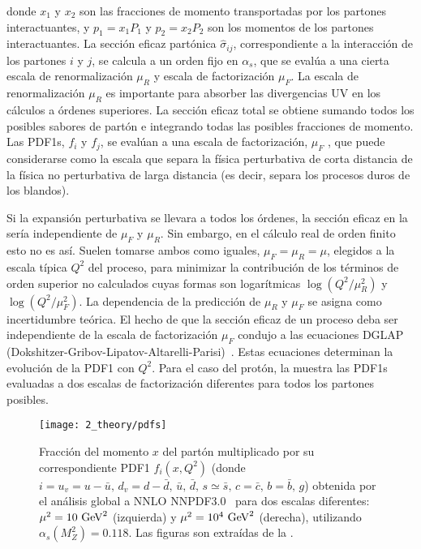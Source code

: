 donde \(x_1\) y \(x_2\) son las fracciones de momento transportadas por los partones interactuantes, y \(p_1 = x_1 P_1\) y \(p_2 = x_2 P_2\) son los momentos de los partones interactuantes. La sección eficaz partónica \(\hat{\sigma}_{ij}\), correspondiente a la interacción de los partones \(i\) y \(j\), se calcula a un orden fijo en \(\alpha_s\), que se evalúa a una cierta escala de renormalización \(\mu_R\) y escala de factorización \(\mu_F\). La escala de renormalización \(\mu_R\) es importante para absorber las divergencias \ac{UV} en los cálculos a órdenes superiores. La sección eficaz total se obtiene sumando todos los posibles sabores de partón e integrando todas las posibles fracciones de momento. Las \acp{PDF1}, \(f_i\) y \(f_j\), se evalúan a una escala de factorización, \(\mu_F\) , que puede considerarse como la escala que separa la física perturbativa de corta distancia de la física no perturbativa de larga distancia (es decir, separa los procesos duros de los blandos).

Si la expansión perturbativa se llevara a todos los órdenes, la sección eficaz en la \Eqn{\ref{eq:theory:sm:hadron_interactions:xs}} sería independiente de \(\mu_F\) y \(\mu_R\). Sin embargo, en el cálculo real de orden finito esto no es así. Suelen tomarse ambos como iguales, \(\mu_F = \mu_R = \mu\), elegidos a la escala típica \(Q^2\) del proceso, para minimizar la contribución de los términos de orden superior no calculados cuyas formas son logarítmicas \(\log\left(Q^2/\mu_R^2\right)\) y \(\log\left(Q^2/\mu_F^2\right)\). La dependencia de la predicción de \(\mu_R\) y \(\mu_F\) se asigna como incertidumbre teórica. El hecho de que la sección eficaz de un proceso deba ser independiente de la escala de factorización \(\mu_F\) condujo a las ecuaciones DGLAP (Dokshitzer-Gribov-Lipatov-Altarelli-Parisi)~\cite{Dokshitzer-1977,Gribov_Lipatov-1971,Altarelli_Parisi-1977}. Estas ecuaciones determinan la evolución de la \ac{PDF1} con \(Q^2\).
Para el caso del protón, la \Fig{\ref{fig:theory:sm:hadron_interactions:pdfs}} muestra las \acp{PDF1} evaluadas a dos escalas de factorización diferentes para todos los partones posibles.

\begin{figure}[ht!]
    \centering
    \texttt{[image: 2\_theory/pdfs]}
    \caption{Fracción del momento \(x\) del partón multiplicado por su correspondiente \acs{PDF1} \(f_i(x, Q^2)\) (donde \(i = u_v = u - \bar{u}, \, d_v = d - \bar{d},\, \bar{u},\, \bar{d},\, s\simeq\bar{s},\, c=\bar{c},\, b=\bar{b},\, g \)) obtenida por el análisis global a \ac{NNLO} NNPDF3.0~\cite{NNPDF} para dos escalas diferentes: \(\mu^2 = 10~\text{GeV}^2\) (izquierda) y \(\mu^2 = 10^4~\text{GeV}^2\) (derecha), utilizando \(\alpha_s(M_Z^2) = 0.118\). Las figuras son extraídas de la .}
    \label{fig:theory:sm:hadron_interactions:pdfs}
\end{figure}




